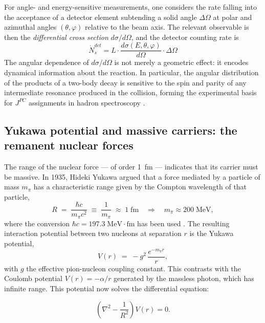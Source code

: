 For angle- and energy-sensitive measurements, one considers the rate falling
into the acceptance of a detector element subtending a solid angle $\Delta\Omega$
at polar and azimuthal angles $(\theta, \varphi)$ relative to the beam axis. The
relevant observable is then the \emph{differential cross section}
$d\sigma/d\Omega$, and the detector counting rate is
\begin{equation}
    \dot{N}_s^{det} = L \cdot \frac{d \sigma (E, \theta, \varphi)}{d \Omega} \cdot \Delta\Omega
\end{equation}
The angular dependence of $d\sigma/d\Omega$ is not merely a geometric effect: it
encodes dynamical information about the reaction. In particular, the angular
distribution of the products of a two-body decay is sensitive to the spin and parity
of any intermediate resonance produced in the collision, forming the experimental
basis for $J^{PC}$ assignments in hadron spectroscopy \cite[Ch.~2]{Amsler2018}.
 
\FloatBarrier

\subsection{Yukawa potential and massive carriers: the remanent nuclear forces}
\label{subsec:yukawa}
 
The range of the nuclear force --- of order 1~fm --- indicates that its carrier must
be massive. In 1935, Hideki Yukawa argued that a force mediated by a particle of
mass $m_\pi$ has a characteristic range given by the Compton wavelength of that
particle,
\begin{equation}
    R \;=\; \frac{\hbar c}{m_\pi c^2}
      \;\equiv\; \frac{1}{m_\pi}
      \;\approx\; 1\;\mathrm{fm}
      \quad\Longrightarrow\quad
      m_\pi \approx 200\;\mathrm{MeV},
    \label{eq:yukawa_range}
\end{equation}
where the conversion $\hbar c = 197.3\;\mathrm{MeV\!\cdot\!fm}$ has been used
\cite[Ch.~2]{Amsler2018}. The resulting interaction potential between two nucleons
at separation $r$ is the Yukawa potential,
\begin{equation}
    V(r) \;=\; -g^2\,\frac{e^{-m_\pi r}}{r},
    \label{eq:yukawa}
\end{equation}
with $g$ the effective pion-nucleon coupling constant. This contrasts with the
Coulomb potential $V(r) = -\alpha/r$ generated by the massless photon, which
has infinite range. This potential now solves the differential equation:

\begin{equation}
    \left(\nabla^2- \frac{1}{R^2} \right) V(r) = 0.
    \label{eq:eqdiffyukawa}
\end{equation}

